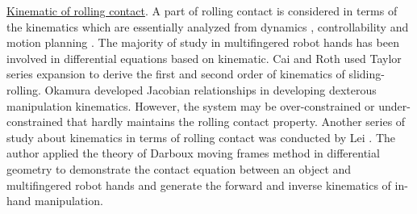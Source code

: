 \noindent\uline{Kinematic of rolling contact}.
A part of rolling contact is considered in terms of the kinematics which are essentially analyzed from dynamics 
\cite{Sarkar97_DynamicControl_3D_RC, Arimoto03_DynamicForceTorque_MeanRC, Svinin13_Dynamic_MP_SphereRollingRobot}, controllability \cite{Yun92_Control_RC, Zribi99_Control_RC, Marigo00_Control_RollingBody, Nakashima05_ControlGraspManipulation_RC} and motion planning 
\cite{Cai86_PlanarMotion_PointContact, Z.Li89_MotionPlanning_Dex.Manipulation, Chelouah01_MotionPlanning_RollingSurfaces, Svinin08_MotionPlanning_RollingSphere}. 
The majority of study in multifingered robot hands has been involved in differential equations based on kinematic. Cai and Roth \cite{Cai86_PlanarMotion_PointContact} used Taylor series expansion to derive the first and second order of kinematics of sliding-rolling. 
Okamura \cite{Okamura_2000_Overview_DM} developed Jacobian relationships in developing dexterous manipulation kinematics. However, the system may be over-constrained or under-constrained that hardly maintains the rolling contact property. 
Another series of study about kinematics in terms of rolling contact was conducted by Lei 
\cite{Lei10_Geometric.Kinematics_PointContact, Lei12_Polynomial_Inverse.Kinematics, Lei12_ReciprocityBased_SVD_Inverse.Kinematics,
Lei15_sliding.rolling.loci_kinematics,
Lei15_PolynomialFormulation_InverseKinematics, 
Lei17_In-Hand_Forward.Inverse.Kinematics, Lei18_Rolling.Contact_Kinematics_Multifinger}. The author applied the theory of Darboux moving frames method in differential geometry to demonstrate the contact equation between an object and multifingered robot hands and generate the forward and inverse kinematics of in-hand manipulation.\\

